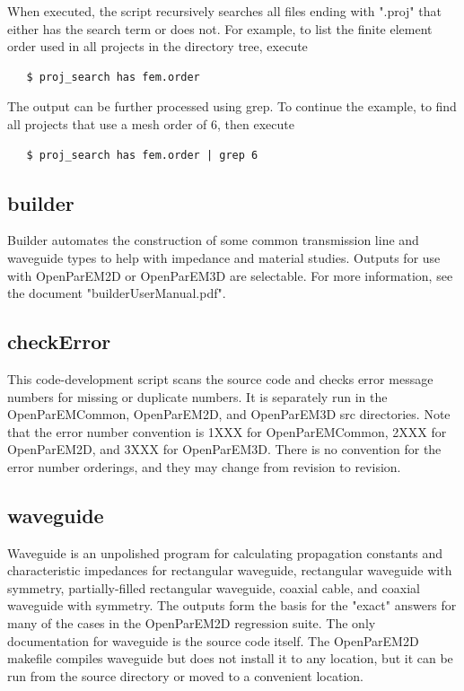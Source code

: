 \documentclass[titlepage]{article}
\renewcommand\_{\textunderscore\linebreak[1]}
\begin{document}
When executed, the script recursively searches all files ending with ".proj" that either has the search term or does not.  For example, to list the finite element order used in all projects in the directory tree, execute

\begin{verbatim}
   $ proj_search has fem.order
\end{verbatim}

\noindent The output can be further processed using grep.  To continue the example, to find all projects that use a mesh order of 6, then execute
\begin{verbatim}
   $ proj_search has fem.order | grep 6
\end{verbatim}

\subsection{builder}

Builder automates the construction of some common transmission line and waveguide types to help with impedance and material studies.  Outputs for use with OpenParEM2D or OpenParEM3D are selectable.  For more information, see the document "builder\_User\_Manual.pdf".

\subsection{checkError}

This code-development script scans the source code and checks error message numbers for missing or duplicate numbers.  It is separately run in the OpenParEMCommon, OpenParEM2D, and OpenParEM3D src directories.  Note that the error number convention is 1XXX for OpenParEMCommon, 2XXX for OpenParEM2D, and 3XXX for OpenParEM3D.  There is no convention for the error number orderings, and they may change from revision to revision.

\subsection{waveguide}

Waveguide is an unpolished program for calculating propagation constants and characteristic impedances for rectangular waveguide, rectangular waveguide with symmetry, partially-filled rectangular waveguide, coaxial cable, and coaxial waveguide with symmetry.  The outputs form the basis for the "exact" answers for many of the cases in the OpenParEM2D regression suite.  The only documentation for waveguide is the source code itself.  The OpenParEM2D makefile compiles waveguide but does not install it to any location, but it can be run from the source directory or moved to a convenient location.
\end{document}
